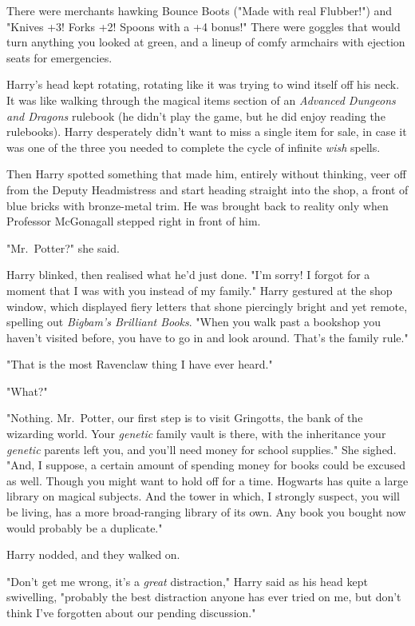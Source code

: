 There were merchants hawking Bounce Boots ("Made with real Flubber!") and
"Knives +3! Forks +2! Spoons with a +4 bonus!" There were goggles that would
turn anything you looked at green, and a lineup of comfy armchairs with
ejection seats for emergencies.

Harry's head kept rotating, rotating like it was trying to wind itself off his
neck. It was like walking through the magical items section of an
\emph{Advanced Dungeons and Dragons} rulebook (he didn't play the game, but he
did enjoy reading the rulebooks). Harry desperately didn't want to miss a
single item for sale, in case it was one of the three you needed to complete
the cycle of infinite \emph{wish} spells.

Then Harry spotted something that made him, entirely without thinking, veer off
from the Deputy Headmistress and start heading straight into the shop, a front
of blue bricks with bronze-metal trim. He was brought back to reality only when
Professor McGonagall stepped right in front of him.

"Mr.~Potter?" she said.

Harry blinked, then realised what he'd just done. "I'm sorry! I forgot for a
moment that I was with you instead of my family." Harry gestured at the shop
window, which displayed fiery letters that shone piercingly bright and yet
remote, spelling out \emph{Bigbam's Brilliant Books}. "When you walk past a
bookshop you haven't visited before, you have to go in and look around. That's
the family rule."

"That is the most Ravenclaw thing I have ever heard."

"What?"

"Nothing. Mr.~Potter, our first step is to visit Gringotts, the bank of the
wizarding world. Your \emph{genetic} family vault is there, with the
inheritance your \emph{genetic} parents left you, and you'll need money for
school supplies." She sighed. "And, I suppose, a certain amount of spending
money for books could be excused as well. Though you might want to hold off for
a time. Hogwarts has quite a large library on magical subjects. And the tower
in which, I strongly suspect, you will be living, has a more broad-ranging
library of its own. Any book you bought now would probably be a duplicate."

Harry nodded, and they walked on.

"Don't get me wrong, it's a \emph{great} distraction," Harry said as his head
kept swivelling, "probably the best distraction anyone has ever tried on me,
but don't think I've forgotten about our pending discussion."

